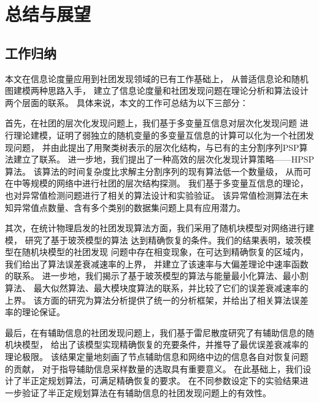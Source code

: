 \chapter{总结与展望}\label{chp:summary}
\section{工作归纳}
本文在信息论度量应用到社团发现领域的已有工作基础上，
从普适信息论和随机图建模两种思路入手，
建立了信息论度量和社团发现问题在理论分析和算法设计两个层面的联系。
具体来说，本文的工作可总结为以下三部分：

首先，在社团的层次化发现问题上，我们基于多变量互信息对层次化发现问题
进行理论建模，证明了弱独立的随机变量的多变量互信息的计算可以化为一个社团发现问题，
并由此提出了用聚类树表示的层次化结构，与已有的主分割序列PSP算法建立了联系。
进一步地，我们提出了一种高效的层次化发现计算策略——HPSP算法。
该算法的时间复杂度比求解主分割序列的现有算法低一个数量级，
从而可在中等规模的网络中进行社团的层次结构探测。
我们基于多变量互信息的理论，也对异常值检测问题进行了相关的算法设计和实验验证。
该异常值检测算法在未知异常值点数量、含有多个类别的数据集问题上具有应用潜力。

其次，在统计物理启发的社团发现算法方面，我们采用了随机块模型对网络进行建模，
研究了基于玻茨模型的算法
达到精确恢复的条件。我们的结果表明，玻茨模型在随机块模型的社团发现
问题中存在相变现象，在可达到精确恢复的区域内，我们给出了算法误差衰减速率的上界，
并建立了该速率与大偏差理论中速率函数的联系。
进一步地，我们揭示了基于玻茨模型的算法与能量最小化算法、最小割算法、
最大似然算法、最大模块度算法的联系，并比较了它们的误差衰减速率的上界。
该方面的研究为算法分析提供了统一的分析框架，并给出了相关算法误差率的理论保证。

最后，在有辅助信息的社团发现问题上，我们基于雷尼散度研究了有辅助信息的随机块模型，
给出了该模型实现精确恢复的充要条件，并推导了最优误差衰减率的理论极限。
该结果定量地刻画了节点辅助信息和网络中边的信息各自对恢复问题的贡献，
对于指导辅助信息采样数量的选取具有重要意义。
在此基础上，我们设计了半正定规划算法，可满足精确恢复的要求。
在不同参数设定下的实验结果进一步验证了半正定规划算法在有辅助信息的社团发现问题上的有效性。


